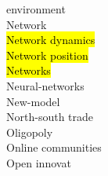 \documentclass[a4paper]{article}
\begin{document}
\begin{multicols*}{2}
\begin{footnotesize}
environment \\ Network \\ \hl{Network dynamics} \\ \hl{Network position} \\ \hl{Networks} \\ Neural-networks \\ New-model \\ North-south trade \\ Oligopoly \\ Online communities \\ Open innovat
\end{footnotesize}
\end{multicols*}
\end{document}
